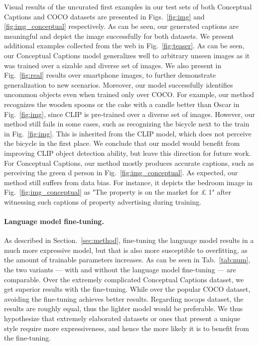 Visual results of the uncurated first examples in our test sets of both Conceptual Captions and COCO datasets are presented in Figs.~\ref{fig:img} and \ref{fig:img_conceptual} respectively. As can be seen, our generated captions are meaningful and depict the image successfully for both datasets. We present additional examples collected from the web in Fig.~\ref{fig:teaser}. As can be seen, our Conceptual Captions model generalizes well to arbitrary unseen images as it was trained over a sizable and diverse set of images. We also present in Fig.~\ref{fig:real} results over smartphone images,  to further demonstrate generalization to new scenarios. Moreover, our model successfully identifies uncommon objects even when trained only over COCO. For example, our method recognizes the wooden spoons or the cake with a candle better than Oscar in Fig.~\ref{fig:img}, since CLIP is pre-trained over a diverse set of images. 
However, our method still fails in some cases, such as recognizing the bicycle next to the train in Fig.~\ref{fig:img}. This is inherited from the CLIP model, which does not perceive the bicycle in the first place. We conclude that our model would benefit from improving CLIP object detection ability, but leave this direction for future work.  
For Conceptual Captions, our method mostly produces accurate captions, such as perceiving the green d person in Fig.~\ref{fig:img_conceptual}. As expected, our method still suffers from data bias. For instance, it depicts the bedroom image in Fig.~\ref{fig:img_conceptual} as "The property is on the market for £ 1" after witnessing such captions of property advertising during training. 



\paragraph{Language model fine-tuning.}
As described in Section.~\ref{sec:method}, fine-tuning the language model results in a much more expressive model, but that is also more susceptible to overfitting, as the amount of trainable parameters increases. As can be seen in Tab.~\ref{tab:num}, the two variants --- with and without the language model fine-tuning --- are comparable. Over the extremely complicated Conceptual Captions dataset, we get superior results with the fine-tuning. While over the popular COCO dataset, avoiding the fine-tuning achieves better results. Regarding nocaps dataset, the results are roughly equal, thus the lighter model would be preferable. We thus hypothesize that extremely elaborated datasets or ones that present a unique style require more expressiveness, and hence the more likely it is to benefit from the fine-tuning.



